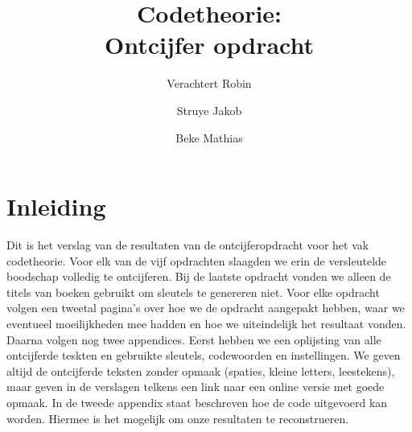 \documentclass[a4paper,11pt]{article}
\author{
  Verachtert Robin\\
  \and
  Struye Jakob\\
  \and
  Beke Mathias\\
}
\title{Codetheorie: \\Ontcijfer opdracht}
\begin{document}
\maketitle
\tableofcontents
\pagebreak

\section{Inleiding}
Dit is het verslag van de resultaten van de ontcijferopdracht voor het vak codetheorie. Voor elk van de vijf opdrachten slaagden we erin de versleutelde boodschap volledig te ontcijferen. Bij de laatste opdracht vonden we alleen de titels van boeken gebruikt om sleutels te genereren niet. Voor elke opdracht volgen een tweetal pagina's over hoe we de opdracht aangepakt hebben, waar we eventueel moeilijkheden mee hadden en hoe we uiteindelijk het resultaat vonden. Daarna volgen nog twee appendices. Eerst hebben we een oplijsting van alle ontcijferde teskten en gebruikte sleutels, codewoorden en instellingen. We geven altijd de ontcijferde teksten zonder opmaak (spaties, kleine letters, leestekens), maar geven in de verslagen telkens een link naar een online versie met goede opmaak. In de tweede appendix staat beschreven hoe de code uitgevoerd kan worden. Hiermee is het mogelijk om onze resultaten te reconstrueren.




\pagebreak %


\pagebreak %

\end{document}

